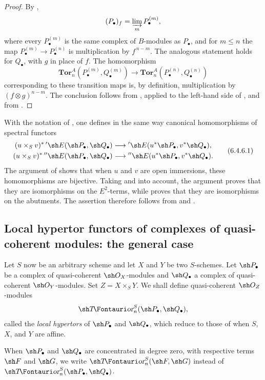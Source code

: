 \begin{proof}
By ,
\[
  (P_\bullet)_f=\varinjlim_m P_\bullet^{(m)},
\]
where every $P_\bullet^{(m)}$ is the same complex of $B$-modules
as $P_\bullet$, and for $m\leq n$ the map
$P_\bullet^{(m)}\longrightarrow P_\bullet^{(n)}$ is
multiplication by $f^{\,n-m}$.  The analogous statement holds for
$Q_\bullet$, with $g$ in place of $f$.  The homomorphism
\[
  \mathbf{Tor}_n^A(P_\bullet^{(m)},Q_\bullet^{(m)})
  \longrightarrow
  \mathbf{Tor}_n^A(P_\bullet^{(n)},Q_\bullet^{(n)})
\]
corresponding to these transition maps is, by definition,
multiplication by $(f\otimes g)^{n-m}$.  The conclusion follows
from , applied to the left-hand side of
, and from .
\end{proof}

\begin{env}[6.4.6]
\label{III.6.4.6}
With the notation of , one defines in the same way
canonical homomorphisms of spectral functors
\[
  \begin{aligned}
  (u\times_Sv)^*\,{}'\sh E(\sh P_\bullet,\sh Q_\bullet)
  &\longrightarrow
  {}'\sh E(u^*\sh P_\bullet,v^*\sh Q_\bullet),\\
  (u\times_Sv)^*\,{}''\sh E(\sh P_\bullet,\sh Q_\bullet)
  &\longrightarrow
  {}''\sh E(u^*\sh P_\bullet,v^*\sh Q_\bullet).
  \end{aligned}
  \tag{6.4.6.1}\label{III.6.4.6.1}
\]
The argument of  shows that when $u$ and $v$ are
open immersions, these homomorphisms are bijective.  Taking
 and  into account, the
argument proves that they are isomorphisms on the $E^2$-terms,
while  proves that they are isomorphisms on the
abutments.  The assertion therefore follows from
 and .
\end{env}


\subsection{Local hypertor functors of complexes of quasi-coherent modules: the general case}
\label{subsection:III.6.5}

\begin{env}[6.5.1]
\label{III.6.5.1}
Let $S$ now be an arbitrary scheme and let $X$ and $Y$ be two
$S$-schemes.  Let $\sh P_\bullet$ be a complex of quasi-coherent
$\sh O_X$-modules and $\sh Q_\bullet$ a complex of quasi-coherent
$\sh O_Y$-modules.  Set $Z=X\times_SY$.  We shall define
quasi-coherent $\sh O_Z$-modules
\[
  \shTor_n^S(\sh P_\bullet,\sh Q_\bullet),
\]
called the \emph{local hypertors} of $\sh P_\bullet$ and
$\sh Q_\bullet$, which reduce to those of  when
$S$, $X$, and $Y$ are affine.

When $\sh P_\bullet$ and $\sh Q_\bullet$ are concentrated in
degree zero, with respective terms $\sh F$ and $\sh G$, we write
$\shTor_n^S(\sh F,\sh G)$ instead of
$\shTor_n^S(\sh P_\bullet,\sh Q_\bullet)$.
\end{env}

